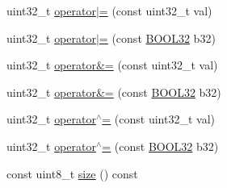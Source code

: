 \begin{DoxyCompactItemize}
\item 
uint32\+\_\+t \hyperlink{struct_b_o_o_l32_a26246376aea1ea939187c2ebbf223f16}{operator$\vert$=} (const uint32\+\_\+t val)
\item 
uint32\+\_\+t \hyperlink{struct_b_o_o_l32_a54d0ae603440f3143c44021b285b730c}{operator$\vert$=} (const \hyperlink{struct_b_o_o_l32}{B\+O\+O\+L32} b32)
\item 
uint32\+\_\+t \hyperlink{struct_b_o_o_l32_aa1223fee28c9734b7c05d80ad5a976f6}{operator\&=} (const uint32\+\_\+t val)
\item 
uint32\+\_\+t \hyperlink{struct_b_o_o_l32_a0bc29e2332dc90f34582312ffb03a056}{operator\&=} (const \hyperlink{struct_b_o_o_l32}{B\+O\+O\+L32} b32)
\item 
uint32\+\_\+t \hyperlink{struct_b_o_o_l32_a4de37092f7ce5ef18af42463178ff1ad}{operator$^\wedge$=} (const uint32\+\_\+t val)
\item 
uint32\+\_\+t \hyperlink{struct_b_o_o_l32_a66f1d7ff5bdb09a1e3eeae9fcca517f1}{operator$^\wedge$=} (const \hyperlink{struct_b_o_o_l32}{B\+O\+O\+L32} b32)
\item 
const uint8\+\_\+t \hyperlink{struct_b_o_o_l32_a675a7e950b6326141f343c88813137e9}{size} () const
\end{DoxyCompactItemize}
